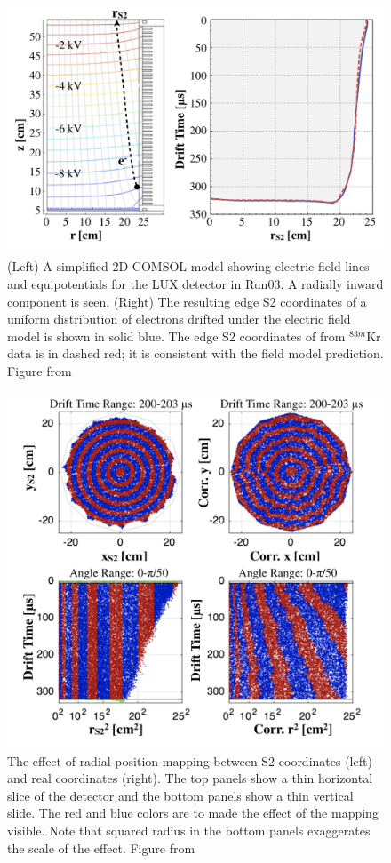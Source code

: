 \begin{figure}[htbp]
\begin{center}
\includegraphics[width=.8\textwidth]{figures/lux/kr_pos1.png}
\caption{ (Left) A simplified 2D COMSOL model showing electric field lines and equipotentials for the \ac{LUX} detector in Run03. A radially inward component is seen. (Right) The resulting edge S2 coordinates of a uniform distribution of electrons drifted under the electric field model is shown in solid blue. The edge S2 coordinates of from $^{83m}$Kr data is in dashed red; it is consistent with the field model prediction. Figure from \cite{LUXKr}}
\label{fig:kr_pos1}
\end{center}
\end{figure}

\begin{figure}[htbp]
\begin{center}
\includegraphics[width=.8\textwidth]{figures/lux/kr_pos2.png}
\caption{ The effect of radial position mapping between S2 coordinates (left) and real coordinates (right). The top panels show a thin horizontal slice of the detector and the bottom panels show a thin vertical slide. The red and blue colors are to made the effect of the mapping visible. Note that squared radius in the bottom panels exaggerates the scale of the effect. Figure from \cite{LUXKr} }
\label{fig:kr_pos2}
\end{center}
\end{figure}


